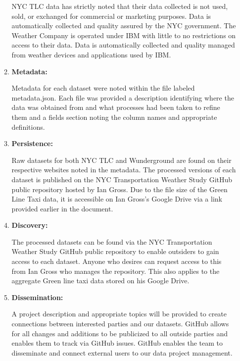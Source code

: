 \documentclass{article}
\begin{document}
\begin{enumerate}
\begin{enumerate}
        NYC TLC data has strictly noted that their data collected is not used, sold, or exchanged for commercial or marketing purposes. Data is automatically collected and quality assured by the NYC government. The Weather Company is operated under IBM with little to no restrictions on access to their data. Data is automatically collected and quality managed from weather devices and applications used by IBM.


        \item
        \textbf{Metadata:}

        Metadata for each dataset were noted within the file labeled metadata.json. Each file was provided a description identifying where the data was obtained from and what processes had been taken to refine them and a fields section noting the column names and appropriate definitions.


        \item
        \textbf{Persistence:}

        Raw datasets for both NYC TLC and Wunderground are found on their respective websites noted in the metadata. The processed versions of each dataset is published on the NYC Transportation Weather Study GitHub public repository hosted by Ian Gross. Due to the file size of the Green Line Taxi data, it is accessible on Ian Gross's Google Drive via a link provided earlier in the document.


        \item
        \textbf{Discovery:}

        The processed datasets can be found via the NYC Transportation Weather Study GitHub public repository to enable outsiders to gain access to each dataset. Anyone who desires can request access to this from Ian Gross who manages the repository. This also applies to the aggregate Green line taxi data stored on his Google Drive.


        \item
        \textbf{Dissemination:}

        A project description and appropriate topics will be provided to create connections between interested parties and our datasets. GitHub allows for all changes and additions to be publicized to all outside parties and enables them to track via GitHub issues. GitHub enables the team to disseminate and connect external users to our data project management.
        
    
    \end{enumerate}



\end{enumerate}
\end{document}
